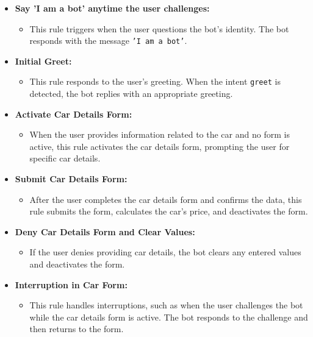 \documentclass[a4paper,12pt]{article}
\begin{document}
\begin{itemize}
	\item \textbf{Say 'I am a bot' anytime the user challenges:}
	\begin{itemize}
		\item This rule triggers when the user questions the bot's identity. The bot responds with the message \texttt{'I am a bot'}.
	\end{itemize}
	
	\item \textbf{Initial Greet:}
	\begin{itemize}
		\item This rule responds to the user's greeting. When the intent \texttt{greet} is detected, the bot replies with an appropriate greeting.
	\end{itemize}
	
	\item \textbf{Activate Car Details Form:}
	\begin{itemize}
		\item When the user provides information related to the car and no form is active, this rule activates the car details form, prompting the user for specific car details.
	\end{itemize}
	
	\item \textbf{Submit Car Details Form:}
	\begin{itemize}
		\item After the user completes the car details form and confirms the data, this rule submits the form, calculates the car's price, and deactivates the form.
	\end{itemize}
	
	\item \textbf{Deny Car Details Form and Clear Values:}
	\begin{itemize}
		\item If the user denies providing car details, the bot clears any entered values and deactivates the form.
	\end{itemize}
	
	\item \textbf{Interruption in Car Form:}
	\begin{itemize}
		\item This rule handles interruptions, such as when the user challenges the bot while the car details form is active. The bot responds to the challenge and then returns to the form.
	\end{itemize}
	

\end{itemize}
\end{document}
